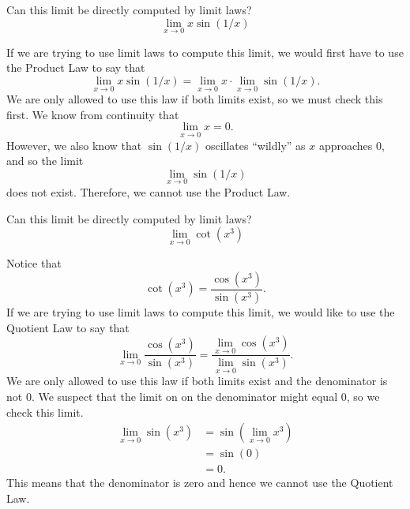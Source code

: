 \documentclass{ximera}
\begin{document}
\begin{question}
  Can this limit be directly computed by limit laws?
  \[
  \displaystyle\lim_{x\to 0} x\sin(1/x)
  \]
  \begin{multipleChoice}
  \end{multipleChoice}
  \begin{feedback}
    If we are trying to use limit laws to compute this limit, we would
    first have to use the Product Law to say that
    \[
    \displaystyle\lim_{x\to 0}x\sin(1/x)= \lim_{x\to 0} x \cdot \lim_{x\to 0} \sin(1/x).
    \]
    We are only allowed to use this law if both limits exist, so we
    must check this first.  We know from continuity that
    \[
    \displaystyle\lim_{x\to  0}x=0.
    \]
    However, we also know that $\sin(1/x)$ oscillates ``wildly'' as
    $x$ approaches $0$, and so the limit
    \[
    \lim_{x\to 0} \sin(1/x)
    \]does not exist.  Therefore, we cannot use the
    Product Law.
  \end{feedback}
\end{question}


\begin{question}
  Can this limit be directly computed by limit laws?
  \[
  \displaystyle\lim_{x\to 0} \cot(x^3)
  \]
  \begin{multipleChoice}
  \end{multipleChoice}
  \begin{feedback}
    Notice that
    \[
    \cot(x^3) = \frac{\cos(x^3)}{\sin(x^3)}.
    \]
    If we are trying to use limit laws to compute this limit, we would
    like to use the Quotient Law to say that
    \[
    \displaystyle\lim_{x\to 0} \frac{\cos(x^3)}{\sin(x^3)} = \displaystyle\frac{\lim_{x\to 0}
      \cos(x^3)}{\lim_{x\to 0} \sin(x^3)}.
    \]
    We are only allowed to use this law if both limits exist and the
    denominator is not $0$. We suspect that the limit on on the
    denominator might equal $0$, so we check this limit.
    \begin{align*}
      \displaystyle\lim_{x\to 0} \sin(x^3) &= \displaystyle\sin(\lim_{x\to 0}x^3)\\
      &=\sin(0) \\
      &=0.
  \end{align*}
  This means that the denominator is zero and hence we cannot use the
  Quotient Law.
  \end{feedback}
\end{question}
\end{document}
